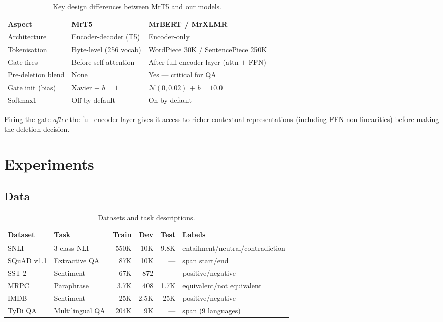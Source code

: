 \documentclass[11pt,a4paper]{article}
\begin{document}
\begin{table}[h]
\centering\small
\begin{tabular}{@{}lll@{}}
\toprule
\textbf{Aspect} & \textbf{MrT5} & \textbf{MrBERT / MrXLMR} \\
\midrule
Architecture       & Encoder-decoder (T5)    & Encoder-only \\
Tokenisation       & Byte-level (256 vocab)  & WordPiece 30K / SentencePiece 250K \\
Gate fires         & Before self-attention   & After full encoder layer (attn $+$ FFN) \\
Pre-deletion blend & None                    & Yes --- critical for QA \\
Gate init (bias)   & Xavier $+$ $b=1$        & $\mathcal{N}(0,0.02)$ $+$ $b=10.0$ \\
Softmax1           & Off by default          & On by default \\
\bottomrule
\end{tabular}
\caption{Key design differences between MrT5 and our models.}
\label{tab:diff-mrt5}
\end{table}

Firing the gate \emph{after} the full encoder layer gives it access to richer contextual representations (including FFN non-linearities) before making the deletion decision.


\section{Experiments}
\label{sec:experiments}

\subsection{Data}

\begin{table}[h]
\centering\small
\begin{tabular}{@{}llrrrL{4cm}@{}}
\toprule
\textbf{Dataset} & \textbf{Task} & \textbf{Train} & \textbf{Dev} & \textbf{Test} & \textbf{Labels} \\
\midrule
SNLI       & 3-class NLI          & 550K  & 10K  & 9.8K & entailment/neutral/contradiction \\
SQuAD v1.1 & Extractive QA        & 87K   & 10K  & ---  & span start/end \\
SST-2      & Sentiment            & 67K   & 872  & ---  & positive/negative \\
MRPC       & Paraphrase           & 3.7K  & 408  & 1.7K & equivalent/not equivalent \\
IMDB       & Sentiment            & 25K   & 2.5K & 25K  & positive/negative \\
TyDi QA   & Multilingual QA      & 204K  & 9K   & ---  & span (9 languages) \\
\bottomrule
\end{tabular}
\caption{Datasets and task descriptions.}
\label{tab:datasets}
\end{table}
\end{document}
